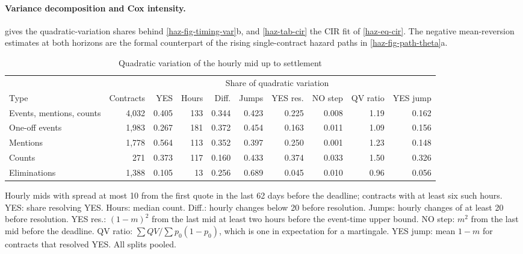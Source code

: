 \paragraph{Variance decomposition and Cox intensity.}
 gives the quadratic-variation shares behind \cref{haz-fig-timing-var}b, and
\cref{haz-tab-cir} the CIR fit of \cref{haz-eq-cir}. The negative mean-reversion estimates at both
horizons are the formal counterpart of the rising single-contract hazard paths in
\cref{haz-fig-path-theta}a.

\begin{table}[ht]
\centering
\begin{threeparttable}
\caption{Quadratic variation of the hourly mid up to settlement}\label{haz-tab-qv}
\footnotesize
\setlength{\tabcolsep}{4pt}
\begin{tabular}{@{}lrrrrrrrrr@{}}
\toprule
 & & & & \multicolumn{4}{c}{Share of quadratic variation} & & \\
\cmidrule(lr){5-8}
Type & Contracts & YES & Hours & Diff. & Jumps & YES res. & NO step & QV ratio & YES jump \\
\midrule
Events, mentions, counts & 4{,}032 & 0.405 & 133 & 0.344 & 0.423 & 0.225 & 0.008 & 1.19 & 0.162 \\
One-off events & 1{,}983 & 0.267 & 181 & 0.372 & 0.454 & 0.163 & 0.011 & 1.09 & 0.156 \\
Mentions       & 1{,}778 & 0.564 & 113 & 0.352 & 0.397 & 0.250 & 0.001 & 1.23 & 0.148 \\
Counts         &    271 & 0.373 & 117 & 0.160 & 0.433 & 0.374 & 0.033 & 1.50 & 0.326 \\
Eliminations   & 1{,}388 & 0.105 &  13 & 0.256 & 0.689 & 0.045 & 0.010 & 0.96 & 0.056 \\
\bottomrule
\end{tabular}
\begin{tablenotes}\footnotesize
\item Hourly mids with spread at most 10\textcent{} from the first quote in the last 62 days before the
deadline; contracts with at least six such hours. YES: share resolving YES. Hours: median count.
Diff.: hourly changes below 20\textcent{} before resolution. Jumps: hourly changes of at least
20\textcent{} before resolution. YES res.: $(1-m)^2$ from the last mid at least two hours before the
event-time upper bound. NO step: $m^2$ from the last mid before the deadline. QV ratio:
$\sum QV/\sum p_0(1-p_0)$, which is one in expectation for a martingale. YES jump: mean $1-m$ for
contracts that resolved YES. All splits pooled.
\end{tablenotes}
\end{threeparttable}
\end{table}


